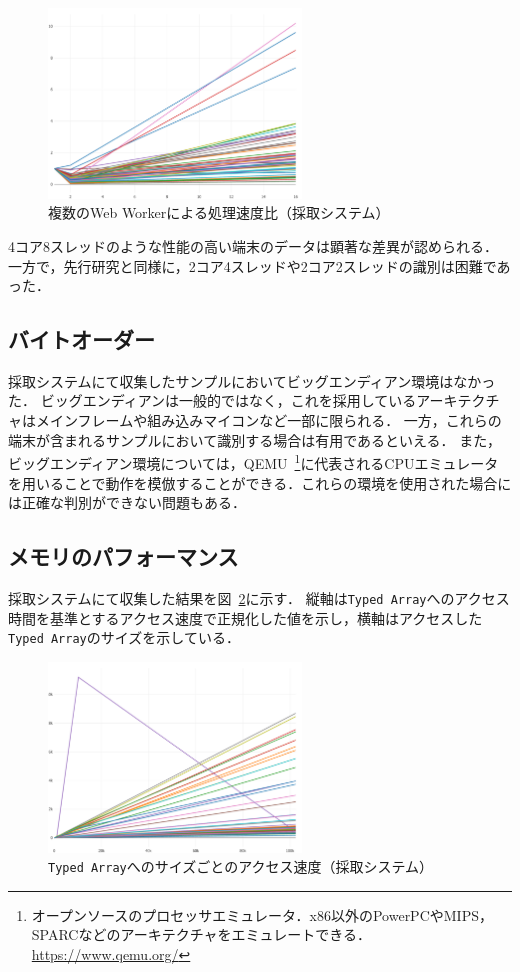 \begin{figure}[H]
    \centering
    \includegraphics[width=0.6\textwidth,pagebox=cropbox]{fig/cpu_rst.pdf}
    \caption{複数のWeb Workerによる処理速度比（採取システム）}
    \label{fig-cpu_rst}
\end{figure}

4コア8スレッドのような性能の高い端末のデータは顕著な差異が認められる．
一方で，先行研究と同様に，2コア4スレッドや2コア2スレッドの識別は困難であった．


\subsection{バイトオーダー}
採取システムにて収集したサンプルにおいてビッグエンディアン環境はなかった．
ビッグエンディアンは一般的ではなく，これを採用しているアーキテクチャはメインフレームや組み込みマイコンなど一部に限られる．
一方，これらの端末が含まれるサンプルにおいて識別する場合は有用であるといえる．
また，ビッグエンディアン環境については，QEMU~\footnote{オープンソースのプロセッサエミュレータ．x86以外のPowerPCやMIPS，SPARCなどのアーキテクチャをエミュレートできる．\url{https://www.qemu.org/}}に代表されるCPUエミュレータを用いることで動作を模倣することができる．これらの環境を使用された場合には正確な判別ができない問題もある．

\subsection{メモリのパフォーマンス}
採取システムにて収集した結果を図~\ref{fig-memory_rst}に示す．
縦軸は\texttt{Typed Array}へのアクセス時間を基準とするアクセス速度で正規化した値を示し，横軸はアクセスした\texttt{Typed Array}のサイズを示している．

\begin{figure}[H]
    \centering
    \includegraphics[width=0.6\textwidth,pagebox=cropbox]{fig/memory_rst.pdf}
    \caption{\texttt{Typed Array}へのサイズごとのアクセス速度（採取システム）}
    \label{fig-memory_rst}
\end{figure}

